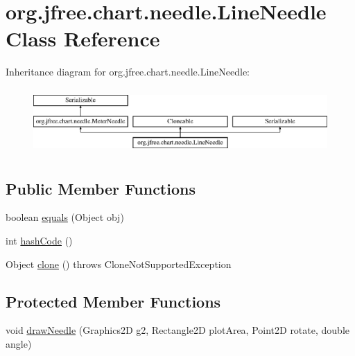\hypertarget{classorg_1_1jfree_1_1chart_1_1needle_1_1_line_needle}{}\section{org.\+jfree.\+chart.\+needle.\+Line\+Needle Class Reference}
\label{classorg_1_1jfree_1_1chart_1_1needle_1_1_line_needle}
Inheritance diagram for org.\+jfree.\+chart.\+needle.\+Line\+Needle\+:\begin{figure}[H]
\begin{center}
\leavevmode
\includegraphics[height=2.533937cm]{classorg_1_1jfree_1_1chart_1_1needle_1_1_line_needle}
\end{center}
\end{figure}
\subsection*{Public Member Functions}
\begin{DoxyCompactItemize}
\item 
boolean \mbox{\hyperlink{classorg_1_1jfree_1_1chart_1_1needle_1_1_line_needle_a06549993fb448958564ad8db7ec27740}{equals}} (Object obj)
\item 
int \mbox{\hyperlink{classorg_1_1jfree_1_1chart_1_1needle_1_1_line_needle_aad00ba0810008646b4e684f8ecb6d03d}{hash\+Code}} ()
\item 
Object \mbox{\hyperlink{classorg_1_1jfree_1_1chart_1_1needle_1_1_line_needle_aef624b61294dd6616a115ce74667be1f}{clone}} ()  throws Clone\+Not\+Supported\+Exception 
\end{DoxyCompactItemize}
\subsection*{Protected Member Functions}
\begin{DoxyCompactItemize}
\item 
void \mbox{\hyperlink{classorg_1_1jfree_1_1chart_1_1needle_1_1_line_needle_a8ef6a2ef7a4b0cd99c4ffc569f4fb238}{draw\+Needle}} (Graphics2D g2, Rectangle2D plot\+Area, Point2D rotate, double angle)
\end{DoxyCompactItemize}
